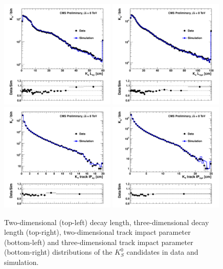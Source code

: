 \begin{figure}[htbp]
\centering
\includegraphics[width=0.49\textwidth]{plots/kshort/kslxy.pdf}
\includegraphics[width=0.49\textwidth]{plots/kshort/kslxyz.pdf}\\
\includegraphics[width=0.49\textwidth]{plots/kshort/kstrkip2d.pdf}
\includegraphics[width=0.49\textwidth]{plots/kshort/kstrkip3d.pdf}\\
\caption{Two-dimensional (top-left) decay length, three-dimensional decay length (top-right), two-dimensional track impact parameter (bottom-left) and three-dimensional track impact parameter (bottom-right) distributions 
of the $K^0_S$ candidates in data and simulation. \label{fig:ksdisplacement}}
\end{figure}

